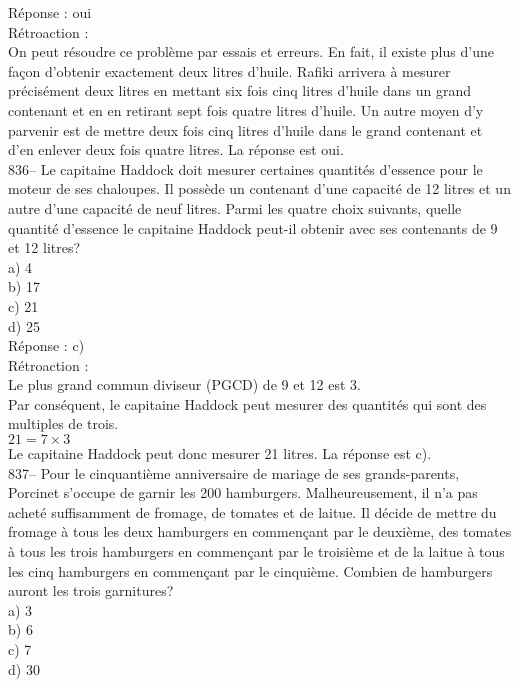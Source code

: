 ﻿\documentclass[letterpaper, 12pt]{article}
\begin{document}
R\'eponse : oui\\

R\'etroaction : \\
On peut r\'esoudre ce probl\`eme par essais et erreurs. En fait, il
existe plus d'une fa\c con d'obtenir exactement deux litres d'huile.
Rafiki arrivera \`a mesurer pr\'ecis\'ement deux litres en mettant
six fois cinq litres d'huile dans un grand contenant et en en
retirant sept fois quatre litres d'huile.  Un autre moyen d'y
parvenir est de mettre deux fois cinq litres d'huile
dans le grand contenant et d'en enlever deux fois quatre litres. La
r\'eponse est oui.\\

836-- Le capitaine Haddock doit mesurer certaines quantit\'es d'essence pour
le moteur de ses chaloupes.  Il poss\`ede un contenant d'une capacit\'e de
12 litres et un autre d'une capacit\'e de neuf litres.  Parmi les quatre
choix suivants, quelle quantit\'e d'essence le capitaine Haddock peut-il
obtenir avec ses contenants de 9 et 12 litres?\\
a) 4\\
b) 17\\
c) 21\\
d) 25\\

R\'eponse : c)\\

R\'etroaction : \\
Le plus grand commun diviseur (PGCD) de 9 et 12 est 3. \\
Par cons\'equent, le capitaine Haddock peut mesurer des quantit\'es qui sont
des multiples de trois.  \\
$21=7\times3$\\
Le capitaine Haddock peut donc mesurer 21 litres.  La r\'eponse est c).\\

837-- Pour le cinquanti\`eme anniversaire de mariage de ses grands-parents,
Porcinet s'occupe de garnir les 200 hamburgers.  Malheureusement, il n'a pas
achet\'e suffisamment de fromage, de tomates et de laitue.  Il d\'ecide de
mettre du fromage \`a tous les deux hamburgers en commen\c cant par le
deuxi\`eme, des tomates \`a tous les trois hamburgers en commen\c cant par
le troisi\`eme et de la laitue \`a tous les cinq hamburgers en commen\c cant
par le cinqui\`eme.  Combien de hamburgers auront les trois garnitures?\\
a) 3\\
b) 6\\
c) 7\\
d) 30\\
\end{document}
